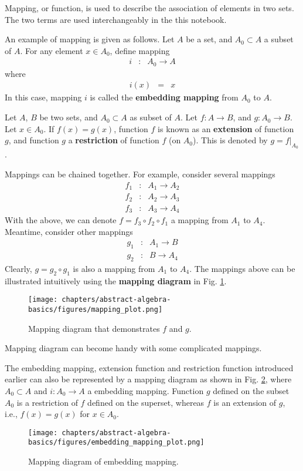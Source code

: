 Mapping, or function, is used to describe the association of elements in two sets. The two terms are used interchangeably in the this notebook. 

An example of mapping is given as follows. Let $A$ be a set, and $A_0 \subset A$ a subset of $A$. For any element $x\in A_0$, define mapping
\begin{eqnarray}
  i &:& A_0 \rightarrow A \nonumber
\end{eqnarray}
where
\begin{eqnarray}
  i(x) &=& x \nonumber
\end{eqnarray}
In this case, mapping $i$ is called the \textbf{embedding mapping} from $A_0$ to $A$.

Let $A$, $B$ be two sets, and $A_0 \subset A$ as subset of $A$. Let $f: A\rightarrow B$, and $g: A_0\rightarrow B$. Let $x\in A_0$. If $f(x)=g(x)$, function $f$ is known as an \textbf{extension} of function $g$, and function $g$ a \textbf{restriction} of function $f$ (on $A_0$). This is denoted by $g=f|_{A_0}$.

Mappings can be chained together. For example, consider several mappings
\begin{eqnarray}
	f_1 &:& A_1 \rightarrow A_2 \nonumber \\
	f_2 &:& A_2 \rightarrow A_3 \nonumber \\
	f_3 &:& A_3 \rightarrow A_4 \nonumber
\end{eqnarray}
With the above, we can denote $f = f_3\circ f_2\circ f_1$ a mapping from $A_1$ to $A_4$. Meantime, consider other mappings
\begin{eqnarray}
	g_1 &:& A_1 \rightarrow B \nonumber \\
	g_2 &:& B \rightarrow A_4 \nonumber 
\end{eqnarray}
Clearly, $g = g_2\circ g_1$ is also a mapping from $A_1$ to $A_4$. The mappings above can be illustrated intuitively using the \textbf{mapping diagram} in Fig. \ref{fig:mapping_plot}.
\begin{figure}[htbp]
	\centering
	\texttt{[image: chapters/abstract-algebra-basics/figures/mapping\_plot.png]}
	\caption{Mapping diagram that demonstrates $f$ and $g$.} \label{fig:mapping_plot}
\end{figure}
Mapping diagram can become handy with some complicated mappings.

The embedding mapping, extension function and restriction function introduced earlier can also be represented by a mapping diagram as shown in Fig. \ref{fig:embedding_mapping_plot}, where $A_0 \subset A$ and $i:A_0\rightarrow A$ a embedding mapping. Function $g$ defined on the subset $A_0$ is a restriction of $f$ defined on the superset, whereas $f$ is an extension of $g$, i.e., $f(x) = g(x)$ for $x\in A_0$.
\begin{figure}[htbp]
	\centering
	\texttt{[image: chapters/abstract-algebra-basics/figures/embedding\_mapping\_plot.png]}
	\caption{Mapping diagram of embedding mapping.} \label{fig:embedding_mapping_plot}
\end{figure}

